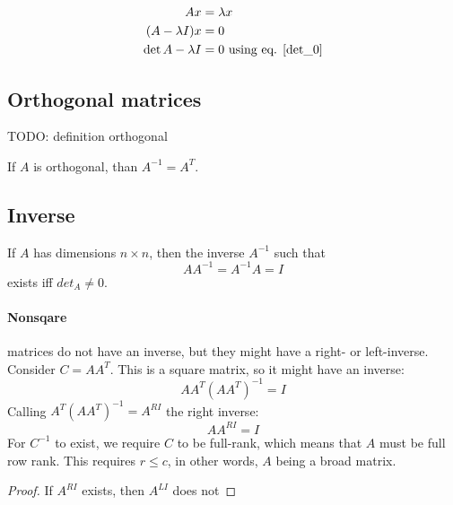 \begin{equation}
    \begin{aligned}
        A x &= \lambda x \\
        ( A - \lambda I ) x &= 0 \\
        \det{A - \lambda I} &= 0 \text{ using eq. \ref{det_0}}
    \end{aligned}
\end{equation}












\subsection{Orthogonal matrices}
TODO: definition orthogonal

\begin{theorem}
    If $A$ is orthogonal, than $A^{-1} = A^T$.
\end{theorem}













\subsection{Inverse}

If $A$ has dimensions $n \times n$, then the inverse $A^{-1}$ such that
$$ A A^{-1} = A^{-1} A = I $$
exists iff $det_A \neq 0$.

\paragraph{Nonsqare} matrices do not have an inverse, but they might have a right- or left-inverse.
Consider $C = A A^T$. This is a square matrix, so it might have an inverse:
$$ A A^T (A A^T)^{-1} = I $$
Calling $A^T (A A^T)^{-1} = A^{RI}$ the right inverse:
$$ A A^{RI} = I $$
For $C^{-1}$ to exist, we require $C$ to be full-rank, which means that $A$ must be full row rank. This  requires $r \leq c$, in other words, $A$ being a broad matrix.

\begin{proof}
If $A^{RI}$ exists, then $A^{LI}$ does not
\end{proof}

